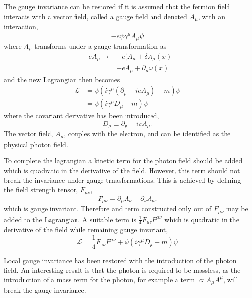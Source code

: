 The gauge invariance can be restored if it is assumed that the fermion field
interacts with a vector field, called a gauge field and denoted $A_{\mu}$, with
an interaction,
\begin{equation}
-e\bar{\psi}\gamma^{\mu}A_{\mu}\psi
\end{equation}
where $A_\mu$ transforms under a gauge transformation as 
\begin{align}
-eA_{\mu} \to & -e(A_{\mu}+\delta A_{\mu}(x)\\
           =   & -e A_{\mu} + \partial_{\mu} \omega (x)
\end{align}
and the new Lagrangian then becomes
\begin{align}
\mathcal{L} 
&= \bar{\psi}( i\gamma^{\mu} ( \partial_{\mu} +i e A_{\mu}) - m)\psi \\
&= \bar{\psi}( i\gamma^{\mu} D_{\mu} - m)\psi 
\end{align}
where the covariant derivative has been introduced,
\begin{equation}
D_{\mu} \equiv \partial_{\mu} - i e A_{\mu}.
\label{eq:covar_deriv}
\end{equation}
The vector field, $A_{\mu}$, couples with the electron, and can be identified as
the physical photon field. 

To complete the lagrangian a kinetic term for the photon field should be added
which is quadratic in the derivative of the field.
However, this term should not break the invariance under gauge trnasformations.
This is achieved by defining the field strength tensor, $F_{\mu\nu}$,
\begin{equation}
F_{\mu\nu}
= \partial_{\mu} A_{\nu} - \partial_{\nu} A_{\mu}.
\label{eq:fieldstrengthtensor}
\end{equation}
which is gauge invariant. Therefore and term constructed only out of 
 $F_{\mu\nu}$ may be added to the Lagrangian.
A suitable term is $\frac{1}{4} F_{\mu\nu} F^{\mu\nu}$ which is quadratic in the
derivative of the field while remaining gauge invariant,
\begin{equation}
\mathcal{L} = \frac{1}{4} F_{\mu\nu} F^{\mu\nu} + \bar{\psi}( i\gamma^{\mu} D_{\mu} - m)\psi 
\end{equation}

Local gauge invariance has been restored with the introduction of the photon
field. An interesting result is that the photon is required to be massless, as
the introduction of a mass term for the photon, for example a term $\propto
A_{\mu}A^{\mu}$, will break the gauge invariance.

